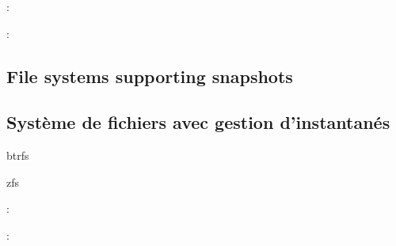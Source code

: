 :
\begin{itmz}
\item{\ml{\todo}
{\todo}}
\end{itmz}

:
\begin{itmz}
\item{\ml{\todo}
{\todo}}
\end{itmz}

\ml
{\subsection{File systems supporting snapshots}}
{\subsection{Système de fichiers avec gestion d’instantanés}}

\begin{itmz}
\item{btrfs}
\item{zfs}
\end{itmz}

:
\begin{itmz}
\item{\ml{\todo}
{\todo}}
\end{itmz}

:
\begin{itmz}
\item{\ml{\todo}
{\todo}}
\end{itmz}
